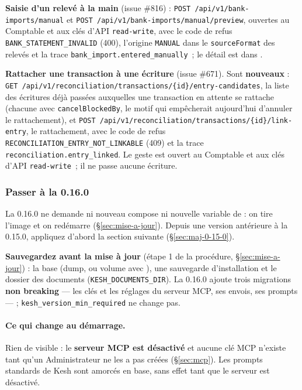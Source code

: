 \documentclass[a4paper,11pt,oneside]{article}
\begin{document}
\begin{sloppypar}
\textbf{Saisie d'un relevé à la main} (issue \#816) : \texttt{POST /api/v1/bank-imports/manual} et \texttt{POST /api/v1/bank-imports/manual/preview}, ouvertes au Comptable et aux clés d'API \texttt{read-write}, avec le code de refus \texttt{BANK\_STATEMENT\_INVALID} (400), l'origine \texttt{MANUAL} dans le \texttt{sourceFormat} des relevés et la trace \texttt{bank\_import.entered\_manually}~; le détail est dans .
\end{sloppypar}

\begin{sloppypar}
\textbf{Rattacher une transaction à une écriture} (issue \#671). Sont \textbf{nouveaux} : \texttt{GET /api/v1/reconciliation/transactions/\{id\}/entry-candidates}, la liste des écritures déjà passées auxquelles une transaction en attente se rattache (chacune avec \texttt{cancelBlockedBy}, le motif qui empêcherait aujourd'hui d'annuler le rattachement), et \texttt{POST /api/v1/reconciliation/transactions/\{id\}/link-entry}, le rattachement, avec le code de refus \texttt{RECONCILIATION\_ENTRY\_NOT\_LINKABLE} (409) et la trace \texttt{reconciliation.entry\_linked}. Le geste est ouvert au Comptable et aux clés d'API \texttt{read-write}~; il ne passe aucune écriture.
\end{sloppypar}

\subsubsection{Passer à la 0.16.0}\label{sec:maj-0-16-0}

La 0.16.0 ne demande ni nouveau compose ni nouvelle variable de  : on tire l'image et on redémarre (\S\ref{sec:mise-a-jour}). Depuis une version antérieure à la 0.15.0, appliquez d'abord la section suivante (\S\ref{sec:maj-0-15-0}).

\begin{sloppypar}
\textbf{Sauvegardez avant la mise à jour} (étape 1 de la procédure, \S\ref{sec:mise-a-jour}) : la base (dump, ou volume avec ), une sauvegarde d'installation  et le dossier des documents (\texttt{KESH\_DOCUMENTS\_DIR}). La 0.16.0 ajoute trois migrations \textbf{non breaking} --- les clés et les réglages du serveur MCP, ses envois, ses prompts --- ; \texttt{kesh\_version\_min\_required} ne change pas.
\end{sloppypar}

\paragraph{Ce qui change au démarrage.} Rien de visible : le \textbf{serveur MCP est désactivé} et aucune clé MCP n'existe tant qu'un Administrateur ne les a pas créées (\S\ref{sec:mcp}). Les prompts standards de Kesh sont amorcés en base, sans effet tant que le serveur est désactivé.
\end{document}
